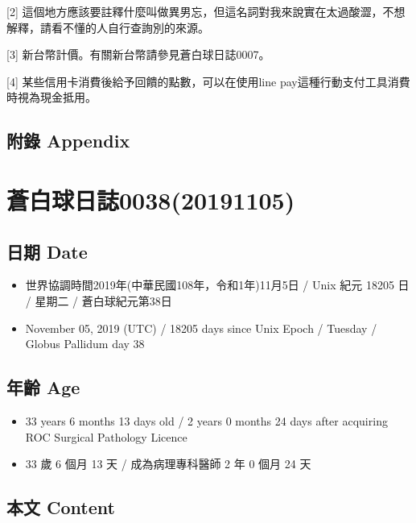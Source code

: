 \documentclass[a5paper, 12pt
]{book}
\providecommand{\tightlist}{%
  \setlength{\itemsep}{0pt}\setlength{\parskip}{0pt}}
\begin{document}
{[}2{]}
這個地方應該要註釋什麼叫做異男忘，但這名詞對我來說實在太過酸澀，不想解釋，請看不懂的人自行查詢別的來源。

{[}3{]} 新台幣計價。有關新台幣請參見蒼白球日誌0007。

{[}4{]} 某些信用卡消費後給予回饋的點數，可以在使用line
pay這種行動支付工具消費時視為現金抵用。

\hypertarget{ux9644ux9304-appendix-29}{%
\subsection{附錄 Appendix}\label{ux9644ux9304-appendix-29}}

\hypertarget{ux84bcux767dux7403ux65e5ux8a8c003820191105}{%
\section{蒼白球日誌0038(20191105)}\label{ux84bcux767dux7403ux65e5ux8a8c003820191105}}

\hypertarget{ux65e5ux671f-date-37}{%
\subsection{日期 Date}\label{ux65e5ux671f-date-37}}

\begin{itemize}
\tightlist
\item
  世界協調時間2019年(中華民國108年，令和1年)11月5日 / Unix 紀元 18205 日
  / 星期二 / 蒼白球紀元第38日
\item
  November 05, 2019 (UTC) / 18205 days since Unix Epoch / Tuesday /
  Globus Pallidum day 38
\end{itemize}

\hypertarget{ux5e74ux9f61-age-37}{%
\subsection{年齡 Age}\label{ux5e74ux9f61-age-37}}

\begin{itemize}
\tightlist
\item
  33 years 6 months 13 days old / 2 years 0 months 24 days after
  acquiring ROC Surgical Pathology Licence
\item
  33 歲 6 個月 13 天 / 成為病理專科醫師 2 年 0 個月 24 天
\end{itemize}

\hypertarget{ux672cux6587-content-37}{%
\subsection{本文 Content}\label{ux672cux6587-content-37}}
\end{document}

